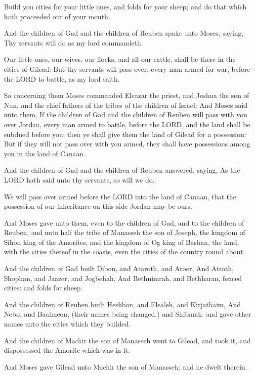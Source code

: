 \verse Build you cities for your little ones, and folds for your sheep;
and do that which hath proceeded out of your mouth.

\verse And the children of Gad and the children of Reuben spake unto
Moses, saying, Thy servants will do as my lord commandeth.

\verse Our little ones, our wives, our flocks, and all our cattle,
shall be there in the cities of Gilead: \verse But thy servants will
pass over, every man armed for war, before the LORD to battle, as my
lord saith.

\verse So concerning them Moses commanded Eleazar the priest, and
Joshua the son of Nun, and the chief fathers of the tribes of the
children of Israel: \verse And Moses said unto them, If the children of
Gad and the children of Reuben will pass with you over Jordan, every
man armed to battle, before the LORD, and the land shall be subdued
before you; then ye shall give them the land of Gilead for a
possession: \verse But if they will not pass over with you armed, they
shall have possessions among you in the land of Canaan.

\verse And the children of Gad and the children of Reuben answered,
saying, As the LORD hath said unto thy servants, so will we do.

\verse We will pass over armed before the LORD into the land of Canaan,
that the possession of our inheritance on this side Jordan may be
ours.

\verse And Moses gave unto them, even to the children of Gad, and to
the children of Reuben, and unto half the tribe of Manasseh the son of
Joseph, the kingdom of Sihon king of the Amorites, and the kingdom of
Og king of Bashan, the land, with the cities thereof in the coasts,
even the cities of the country round about.

\verse And the children of Gad built Dibon, and Ataroth, and Aroer,
\verse And Atroth, Shophan, and Jaazer, and Jogbehah, \verse And
Bethnimrah, and Bethharan, fenced cities: and folds for sheep.

\verse And the children of Reuben built Heshbon, and Elealeh, and
Kirjathaim, \verse And Nebo, and Baalmeon, (their names being changed,)
and Shibmah: and gave other names unto the cities which they builded.

\verse And the children of Machir the son of Manasseh went to Gilead,
and took it, and dispossessed the Amorite which was in it.

\verse And Moses gave Gilead unto Machir the son of Manasseh; and he
dwelt therein.

